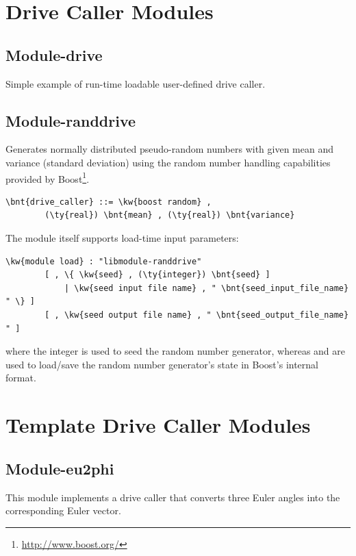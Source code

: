 \section{Drive Caller Modules}

\subsection{Module-drive}
Simple example of run-time loadable user-defined drive caller.


\subsection{Module-randdrive}
Generates normally distributed pseudo-random numbers
with given mean and variance (standard deviation) using 
the random number handling capabilities
provided by Boost\footnote{\url{http://www.boost.org/}}.
\begin{Verbatim}[commandchars=\\\{\}]
    \bnt{drive_caller} ::= \kw{boost random} ,
        (\ty{real}) \bnt{mean} , (\ty{real}) \bnt{variance}
\end{Verbatim}
The module itself supports load-time input parameters:
\begin{Verbatim}[commandchars=\\\{\}]
    \kw{module load} : "libmodule-randdrive"
        [ , \{ \kw{seed} , (\ty{integer}) \bnt{seed} ]
            | \kw{seed input file name} , " \bnt{seed_input_file_name} " \} ]
        [ , \kw{seed output file name} , " \bnt{seed_output_file_name} " ]
\end{Verbatim}
where the integer  is used to seed the random number generator,
whereas  and 
are used to load/save the random number generator's state
in Boost's internal format.



\section{Template Drive Caller Modules}

\subsection{Module-eu2phi}
This module implements a  drive caller
that converts three Euler angles into the corresponding Euler vector.

